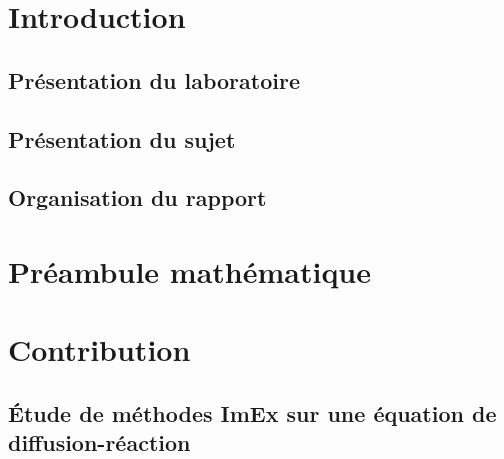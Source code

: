 \documentclass[11pt]{report}
\theoremstyle{definition}
\theoremstyle{remark}
\begin{document}
\newpage

\newpage
\chapter{Introduction}
\section{Présentation du laboratoire}

\section{Présentation du sujet}

\newpage
\section{Organisation du rapport}


\newpage
\chapter{Préambule mathématique}
    \label{par:tech}
    
    \newpage
    

\newpage
\chapter{Contribution}
    \label{par:contrib}
    
    \newpage
    \section{Étude de méthodes ImEx sur une équation de diffusion-réaction}
        \label{par:contrib_1}
        
        \newpage
\end{document}
